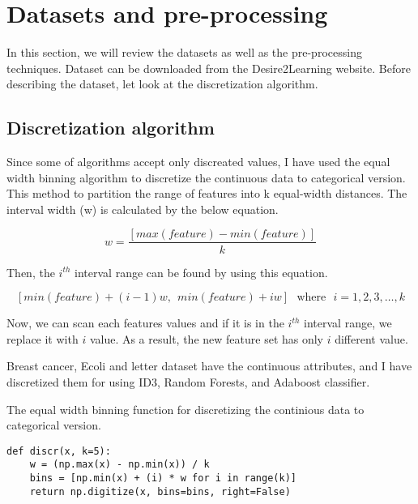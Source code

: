 \vspace{2cm}
\section{ Datasets and pre-processing}
\vspace{2cm}
In this section, we will review the datasets as well as the pre-processing techniques. Dataset can be downloaded from the Desire2Learning website. 
Before describing the dataset, let look at the discretization algorithm.



\subsection{Discretization algorithm}
\label{ses:Discretization}
Since some of algorithms accept only discreated values, I have used the equal width binning algorithm to discretize the continuous data to categorical version. This method to partition the range of features into k equal-width distances. The interval width (w) is calculated by the below equation.

$$
w = \frac{[ max(feature)-min(feature)] }{k}
$$

Then, the $i^{th}$ interval range can be found by using this equation.

$$
[min(feature) + (i-1)w,~~ min(feature) + iw] \mbox{~~where~~}  i = 1, 2, 3, \dots, k
$$

Now, we can scan each features values and if it is in the $i^{th}$ interval range, we replace it with $i$ value. As a result, the new feature set has only $i$ different value.

Breast cancer, Ecoli and letter dataset have the continuous attributes, and I have discretized them for using ID3, Random Forests, and Adaboost classifier. 

\begin{table}[H]
\centering
\caption{The equal width binning function for discretizing the continious data to categorical version.}
\begin{lstlisting}
def discr(x, k=5):
    w = (np.max(x) - np.min(x)) / k
    bins = [np.min(x) + (i) * w for i in range(k)]
    return np.digitize(x, bins=bins, right=False)
\end{lstlisting}
\end{table}





